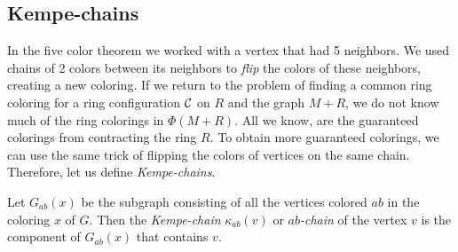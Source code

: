 \subsection{Kempe-chains}

In the five color theorem we worked with a vertex that had 5 neighbors. We used chains of 2 colors between its neighbors to \textit{flip} the colors of these neighbors, creating a new coloring. If we return to the problem of finding a common ring coloring for a ring configuration $\mathcal{C}$ on $R$ and the graph $M+R$, we do not know much of the ring colorings in $\Phi(M+R)$. All we know, are the guaranteed colorings from contracting the ring $R$. To obtain more guaranteed colorings, we can use the same trick of flipping the colors of vertices on the same chain. Therefore, let us define \textit{Kempe-chains}.

\begin{definition}
    Let $G_{ab}(x)$ be the subgraph consisting of all the vertices colored $ab$ in the coloring $x$ of $G$.
    Then the \emph{Kempe-chain} $\kappa_{ab}(v)$ or \emph{$ab$-chain} of the vertex $v$ is the component of $G_{ab}(x)$ that contains $v$. 
\end{definition}

